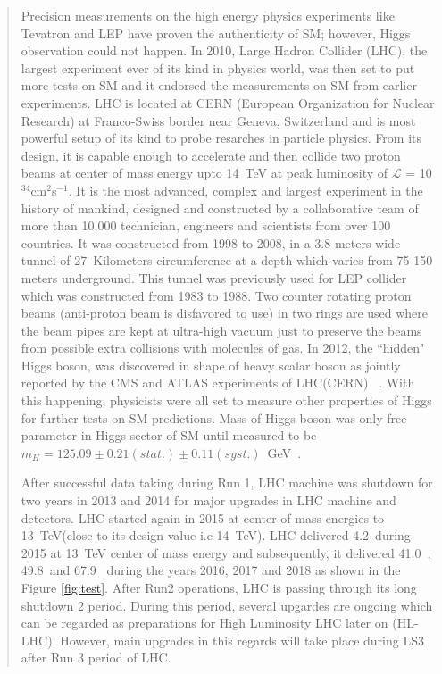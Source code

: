 \begin{abstract}
	\par Precision measurements on the high energy physics experiments like Tevatron and LEP have proven the authenticity of SM; however, Higgs observation could not happen.
In 2010, Large Hadron Collider (LHC), the largest experiment ever of its kind in physics world, was then set to put more tests on SM and it endorsed the measurements on SM from earlier experiments. 
	LHC is located at CERN (European Organization for Nuclear Research)
at Franco-Swiss border near Geneva, Switzerland and is most powerful setup of its kind to probe resarches in particle physics.
From its design, it is capable enough to accelerate and then collide two proton beams at center of mass energy upto 14~TeV at peak luminosity of $\mathscr{L}$ = 10$^{34}$cm$^{2}$s$^{-1}$.%
 It is the most advanced, complex and largest experiment in  
 the history of mankind, designed and constructed by a collaborative team of more than 10,000 technician, engineers and scientists from over 100 countries.
It was constructed from 1998 to 2008, in a 3.8 meters wide tunnel of 27~Kilometers circumference at a depth which varies from 75-150 meters underground. This tunnel was previously used for LEP collider which was constructed from 1983 to 1988. Two counter rotating proton beams (anti-proton beam is disfavored to use) in two rings are used where the beam pipes are kept at ultra-high vacuum just to preserve the beams from possible extra collisions with molecules of gas.
	In 2012, the ``hidden" Higgs boson, was discovered in shape of heavy scalar boson as jointly reported by the CMS and ATLAS experiments of LHC(CERN) ~\cite{Reference20,Reference21}. With this happening, physicists were all set to measure other properties of Higgs for further tests on SM predictions.
Mass of Higgs boson was only free parameter in Higgs sector of SM until measured to be $m_H = 125.09\pm 0.21(stat.)\pm0.11(syst.)$~GeV~\cite{Reference22}.
\par After successful data taking during Run 1, LHC machine was shutdown for two years in 2013 and 2014 for major upgrades in LHC machine and detectors. LHC started again in 2015 at center-of-mass energies to 13~TeV(close to its design value i.e 14~TeV). LHC delivered 4.2~\ifb during 2015 at 13~TeV center of mass energy and subsequently, it delivered 41.0~\ifb, 49.8~\ifb and 67.9~\ifb
during the years 2016, 2017 and 2018 as shown in the Figure \ref{fig:test}.
After Run2 operations, LHC is passing through its long shutdown 2 period. During this period, several upgardes are ongoing which can be regarded as preparations for High Luminosity LHC later on (HL-LHC). However, main upgrades in this regards will take place during LS3 after Run 3 period of LHC.

\end{abstract}
